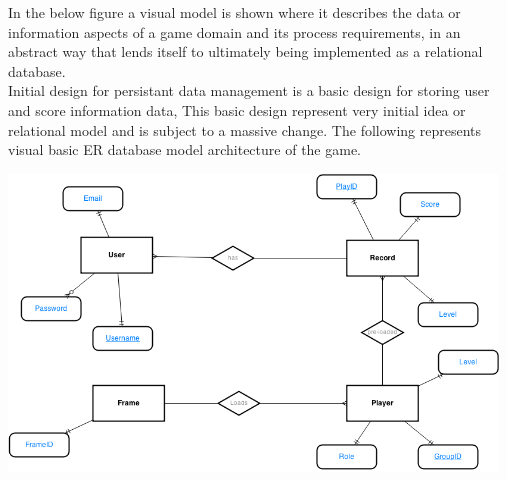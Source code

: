 In the below figure a visual model is shown where it describes the data or information aspects of a game domain and its process requirements, in an abstract way that lends itself to ultimately being implemented as a relational database. \\


Initial design for persistant data management is a basic design for storing user and score information data, This basic design represent very initial idea or relational model and is subject to a massive change. The following represents visual basic ER database model architecture of the game.\\

\begin{center}
	 \includegraphics[width=130mm]{./images/ER.png}

\end{center}

